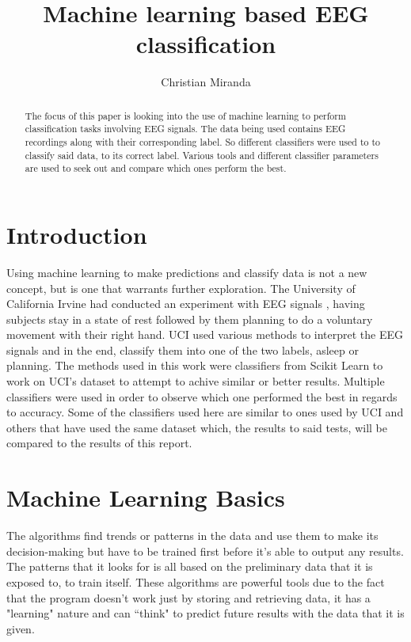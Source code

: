 \documentclass[conference,compsoc]{IEEEtran}
\begin{document}
\author{Christian Miranda}
\title{Machine learning based EEG classification}
\maketitle

\begin{abstract}
The focus of this paper is looking into the use of machine learning to perform classification tasks involving EEG signals.
The data being used contains EEG recordings along with their corresponding label. So different classifiers were used to 
to classify said data, to its correct label. Various tools and different classifier parameters are used to seek 
out and compare which ones perform the best. 
\end{abstract}

\section{Introduction}
Using machine learning to make predictions and classify data is not a new concept, but is one that warrants further exploration. 
The University of California Irvine had conducted an experiment with EEG signals \cite{classsvm}, having subjects stay in a state of rest followed by them planning to do a voluntary movement with their right hand. 
UCI used various methods to interpret the EEG signals and in the end, classify them into one of the two labels, asleep or planning. The methods used in this work were classifiers from Scikit Learn to work on UCI's dataset to attempt to achive similar or better results. Multiple classifiers were used in order to observe which one performed the best in regards 
to accuracy. Some of the classifiers used here are similar to ones used by UCI and others that have used the same dataset \cite{fuzzy} which, the results to said tests, will be compared to the results of this report.

\section{Machine Learning Basics}
The algorithms find trends or patterns in the data and use them to make its decision-making but have to be trained first before it's able to output any results. 
The patterns that it looks for is all based on the preliminary data that it is exposed to, to train itself. These algorithms are powerful tools due to the fact that 
the program doesn't work just by storing and retrieving data, it has a "learning" nature and can ``think" to predict future results with the data that it is given.
\end{document}
